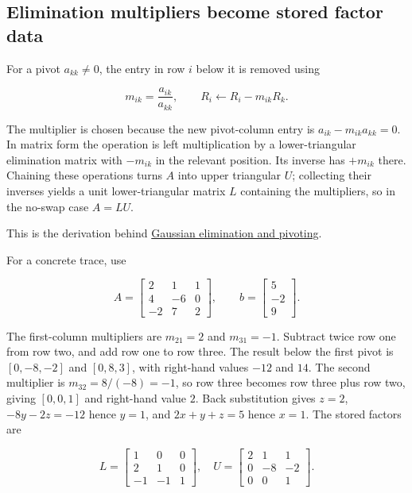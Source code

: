 \subsection{Elimination multipliers become stored factor data}\label{01-foundations-i-ch019-elimination-multipliers-become-stored-factor-data}

For a pivot \(a_{kk}\ne0\), the entry in row \(i\) below it is removed using

\[
m_{ik}=\frac{a_{ik}}{a_{kk}},\qquad R_i\leftarrow R_i-m_{ik}R_k.
\]

The multiplier is chosen because the new pivot-column entry is \(a_{ik}-m_{ik}a_{kk}=0\). In matrix form the operation is left multiplication by a lower-triangular elimination matrix with \(-m_{ik}\) in the relevant position. Its inverse has \(+m_{ik}\) there. Chaining these operations turns \(A\) into upper triangular \(U\); collecting their inverses yields a unit lower-triangular matrix \(L\) containing the multipliers, so in the no-swap case \(A=LU\).

This is the derivation behind \hyperref[01-foundations-i-ch019-elimination-turns-the-geometry-into-an-auditable-calculation]{Gaussian elimination and pivoting}.

For a concrete trace, use

\[
A=\begin{bmatrix}2&1&1\\4&-6&0\\-2&7&2\end{bmatrix},\qquad
b=\begin{bmatrix}5\\-2\\9\end{bmatrix}.
\]

The first-column multipliers are \(m_{21}=2\) and \(m_{31}=-1\). Subtract twice row one from row two, and add row one to row three. The result below the first pivot is \([0,-8,-2]\) and \([0,8,3]\), with right-hand values \(-12\) and \(14\). The second multiplier is \(m_{32}=8/(-8)=-1\), so row three becomes row three plus row two, giving \([0,0,1]\) and right-hand value \(2\). Back substitution gives \(z=2\), \(-8y-2z=-12\) hence \(y=1\), and \(2x+y+z=5\) hence \(x=1\). The stored factors are

\[
L=\begin{bmatrix}1&0&0\\2&1&0\\-1&-1&1\end{bmatrix},\quad
U=\begin{bmatrix}2&1&1\\0&-8&-2\\0&0&1\end{bmatrix}.
\]

